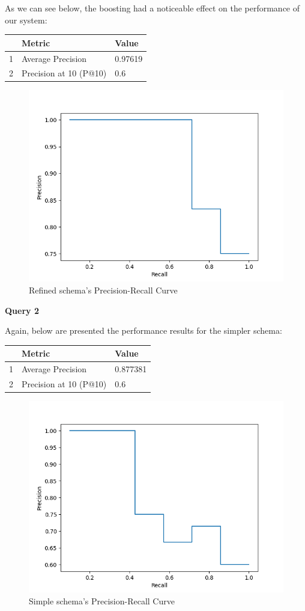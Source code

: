 As we can see below, the boosting had a noticeable effect on the performance of our system:

\begin{center}
\begin{tabular}{lll}
\toprule
 &                  Metric &    Value \\
\midrule
1 &       Average Precision &  0.97619 \\
2 &  Precision at 10 (P@10) &      0.6 \\
\bottomrule
\end{tabular}
\end{center}

\begin{figure}[H]
    \centering
    \includegraphics[width=0.6\linewidth]{figures/toxic.png}
    \caption{Refined schema's Precision-Recall Curve}
\end{figure}



\textbf{Query 2}

Again, below are presented the performance results for the simpler schema:

\begin{center}
\begin{tabular}{lll}
\toprule
 &                  Metric &    Value \\
\midrule
1 &       Average Precision &  0.877381 \\
2 &  Precision at 10 (P@10) &       0.6 \\
\bottomrule
\end{tabular}
\end{center}

\begin{figure}[H]
    \centering
    \includegraphics[width=0.6\linewidth]{figures/disease_simple.png}
    \caption{Simple schema's Precision-Recall Curve}
\end{figure}

